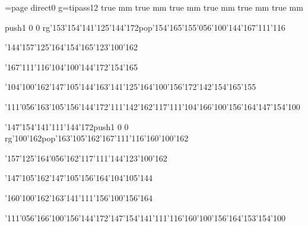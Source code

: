 \chardef\match=\pdfcolorstackinit page direct{0 g}\nopagenumbers\font\ipa=tipass12 true mm true mm true mm true mm true mm true mm
\null\vfill\ipa\centerline{\enskip\pdfcolorstack\match push{1 0 0 rg}\char'153\char'154\char'141\char'125\char'144\char'172\pdfcolorstack\match pop{}\enskip\enskip\enskip\enskip\char'154\char'165\char'155\char'056\char'100\char'144\enskip\enskip\enskip\char'167\char'111\char'116\enskip\enskip\enskip\enskip}\medskip\centerline{\enskip\enskip\enskip\enskip\char'144\char'157\char'125\char'164\enskip\char'154\char'165\enskip\char'123\char'100\char'162\enskip\enskip\enskip\enskip\enskip\enskip\enskip\enskip\enskip}\medskip\centerline{\enskip\char'167\char'111\char'116\enskip\enskip\enskip\enskip\char'104\char'100\char'144\char'172\enskip\char'154\char'165\enskip\enskip\enskip\enskip}\medskip\centerline{\enskip\enskip\enskip\enskip\char'104\char'100\char'162\enskip\char'147\char'105\char'144\enskip\char'163\char'141\char'125\char'164\enskip\char'100\char'156\char'172\enskip\char'142\char'154\char'165\char'155}\medskip\centerline{\enskip\char'111\char'056\char'163\char'105\char'156\char'144\char'172\enskip\char'111\enskip\char'142\char'162\char'117\char'111\char'104\enskip\enskip\enskip\enskip\enskip\enskip\char'166\char'100\char'156\char'164\enskip\char'147\char'154\char'100}\medskip\vfill\footline{\hfil\tt\folio\hfil}\eject
\null\vfill\ipa\centerline{\enskip\char'147\char'154\char'141\char'111\char'144\char'172\enskip\pdfcolorstack\match push{1 0 0 rg}\char'100\char'162\pdfcolorstack\match pop{}\enskip\char'163\char'105\char'162\enskip\enskip\enskip\enskip\enskip\enskip\char'167\char'111\char'116\enskip\char'160\char'100\char'162}\medskip\centerline{\enskip\char'157\char'125\char'164\char'056\char'162\char'117\char'111\char'144\enskip\enskip\enskip\enskip\char'123\char'100\char'162\enskip\enskip\enskip\enskip\enskip\enskip\enskip\enskip\enskip}\medskip\centerline{\enskip\char'147\char'105\char'162\enskip\enskip\enskip\enskip\char'147\char'105\char'156\char'164\enskip\enskip\enskip\char'104\char'105\char'144}\medskip\centerline{\enskip\enskip\enskip\enskip\enskip\enskip\enskip\enskip\char'160\char'100\char'162\enskip\char'163\char'141\char'111\char'156\enskip\char'100\char'156\char'164\enskip\enskip\enskip\enskip\enskip}\medskip\centerline{\enskip\char'111\char'056\char'166\char'100\char'156\char'144\char'172\enskip\enskip\enskip\char'147\char'154\char'141\char'111\char'116\enskip\enskip\enskip\enskip\enskip\enskip\char'160\char'100\char'156\char'164\enskip\char'153\char'154\char'100}\medskip\vfill\footline{\hfil\tt\folio\hfil}\eject
